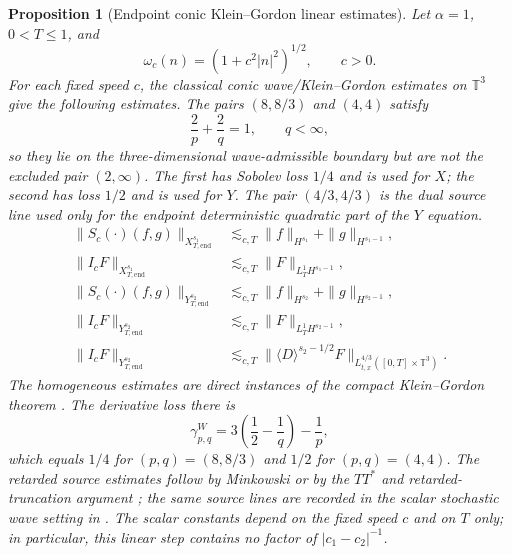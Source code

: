 \documentclass[10pt]{amsart}
\numberwithin{equation}{section}
\theoremstyle{plain}
\newtheorem{proposition}[theorem]{Proposition}
\theoremstyle{definition}
\theoremstyle{remark}
\begin{document}
\begin{proposition}[Endpoint conic Klein--Gordon linear estimates]\label{prop:gko-conic-strichartz}
Let $\alpha=1$, $0<T\le1$, and
\[
        \omega_c(n)=(1+c^2|n|^2)^{1/2},\qquad c>0.
\]
For each fixed speed $c$, the classical conic wave/Klein--Gordon estimates on $\mathbb T^3$ give the following estimates.  The pairs $(8,8/3)$ and $(4,4)$ satisfy
\[
        \frac2p+\frac2q=1,
        \qquad q<\infty,
\]
so they lie on the three-dimensional wave-admissible boundary but are not the excluded pair $(2,\infty)$.  The first has Sobolev loss $1/4$ and is used for $X$; the second has loss $1/2$ and is used for $Y$.  The pair $(4/3,4/3)$ is the dual source line used only for the endpoint deterministic quadratic part of the $Y$ equation.
\begin{align}
 \|S_c(\cdot)(f,g)\|_{X^{s_1}_{T,\mathrm{end}}}
 &\lesssim_{c,T}\|f\|_{H^{s_1}}+\|g\|_{H^{s_1-1}},
 \label{eq:conic-hom-X}\\
 \|I_cF\|_{X^{s_1}_{T,\mathrm{end}}}
 &\lesssim_{c,T}\|F\|_{L_T^1H^{s_1-1}},
 \label{eq:conic-duh-X}\\
 \|S_c(\cdot)(f,g)\|_{Y^{s_2}_{T,\mathrm{end}}}
 &\lesssim_{c,T}\|f\|_{H^{s_2}}+\|g\|_{H^{s_2-1}},
 \label{eq:conic-hom-Y}\\
 \|I_cF\|_{Y^{s_2}_{T,\mathrm{end}}}
 &\lesssim_{c,T}\|F\|_{L_T^1H^{s_2-1}},
 \label{eq:conic-duh-Y}\\
 \|I_cF\|_{Y^{s_2}_{T,\mathrm{end}}}
 &\lesssim_{c,T}\|\langle D\rangle^{s_2-1/2}F\|_{L_{t,x}^{4/3}([0,T]\times\mathbb T^3)}.
 \label{eq:conic-dual-Y}
\end{align}
The homogeneous estimates are direct instances of the compact Klein--Gordon theorem \cite[Theorem~1(1)]{CacciafestaDanesiMeng}.  The derivative loss there is
\[
        \gamma^W_{p,q}=3\left(\frac12-\frac1q\right)-\frac1p,
\]
which equals $1/4$ for $(p,q)=(8,8/3)$ and $1/2$ for $(p,q)=(4,4)$.  The retarded source estimates follow by Minkowski or by the $TT^*$ and retarded-truncation argument \cite{KeelTao}; the same source lines are recorded in the scalar stochastic wave setting in \cite[Lemma~2.4]{GKO}.  The scalar constants depend on the fixed speed $c$ and on $T$ only; in particular, this linear step contains no factor of $|c_1-c_2|^{-1}$.
\end{proposition}
\end{document}
